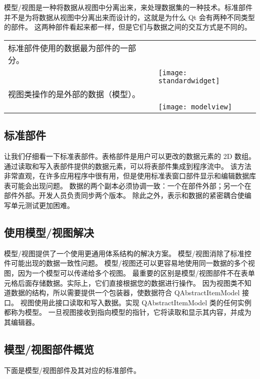 模型/视图是一种将数据从视图中分离出来，来处理数据集的一种技术。标准部件并不是为将数据从视图中分离出来而设计的，这就是为什么 Qt 会有两种不同类型的部件。
这两种部件看起来都一样，但是它们与数据之间的交互方式是不同的。

\begin{longtable}{|l|m{25em}|}
\hline
标准部件使用的数据最为部件的一部分。\\
&
\texttt{[image: standardwidget]} \\ 
\hline	
视图类操作的是外部的数据（模型）。\\
&
\texttt{[image: modelview]} \\ 
\hline	
\end{longtable}

\subsection{标准部件}

让我们仔细看一下标准表部件。表格部件是用户可以更改的数据元素的 2D 数组。
通过读取和写入表部件提供的数据元素，可以将表部件集成到程序流中。
该方法非常直观，在许多应用程序中很有用，但是使用标准表窗口部件显示和编辑数据库表可能会出现问题。
数据的两个副本必须协调一致：一个在部件外部；另一个在部件外部。开发人员负责同步两个版本。
除此之外，表示和数据的紧密耦合使编写单元测试更加困难。

\subsection{使用模型/视图解决}

模型/视图提供了一个使用更通用体系结构的解决方案。
模型/视图消除了标准控件可能出现的数据一致性问题。
模型/视图还可以更容易地使用同一数据的多个视图，因为一个模型可以传递给多个视图。
最重要的区别是模型/视图部件不在表单元格后面存储数据。实际上，它们直接根据您的数据进行操作。
因为视图类不知道数据的结构，所以需要提供一个包装器，使数据符合 QAbstractItemModel 接口。
视图使用此接口读取和写入数据。实现 QAbstractItemModel 类的任何实例都称为模型。
一旦视图接收到指向模型的指针，它将读取和显示其内容，并成为其编辑器。

\subsection{模型/视图部件概览}

下面是模型/视图部件及其对应的标准部件。

